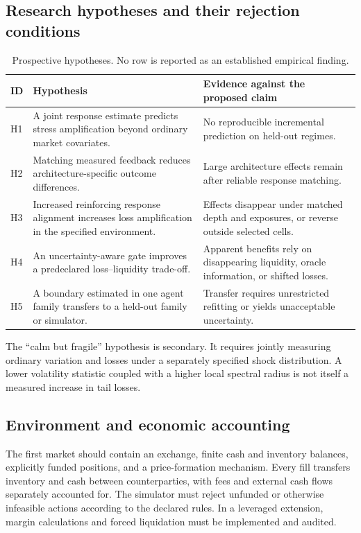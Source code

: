 \documentclass[11pt,a4paper]{article}
\theoremstyle{definition}
\theoremstyle{remark}
\begin{document}
\subsection{Research hypotheses and their rejection conditions}
\begin{table}[htbp]
\centering\small
\caption{Prospective hypotheses. No row is reported as an established empirical finding.}
\label{tab:hypotheses}
\begin{tabularx}{\textwidth}{p{}YY}
\toprule
ID & Hypothesis & Evidence against the proposed claim \\
\midrule
H1 & A joint response estimate predicts stress amplification beyond ordinary market covariates. & No reproducible incremental prediction on held-out regimes.\\
H2 & Matching measured feedback reduces architecture-specific outcome differences. & Large architecture effects remain after reliable response matching.\\
H3 & Increased reinforcing response alignment increases loss amplification in the specified environment. & Effects disappear under matched depth and exposures, or reverse outside selected cells.\\
H4 & An uncertainty-aware gate improves a predeclared loss--liquidity trade-off. & Apparent benefits rely on disappearing liquidity, oracle information, or shifted losses.\\
H5 & A boundary estimated in one agent family transfers to a held-out family or simulator. & Transfer requires unrestricted refitting or yields unacceptable uncertainty.\\
\bottomrule
\end{tabularx}
\end{table}
The ``calm but fragile'' hypothesis is secondary. It requires jointly measuring ordinary variation and losses under a separately specified shock distribution. A lower volatility statistic coupled with a higher local spectral radius is not itself a measured increase in tail losses.

\subsection{Environment and economic accounting}
The first market should contain an exchange, finite cash and inventory balances, explicitly funded positions, and a price-formation mechanism. Every fill transfers inventory and cash between counterparties, with fees and external cash flows separately accounted for. The simulator must reject unfunded or otherwise infeasible actions according to the declared rules. In a leveraged extension, margin calculations and forced liquidation must be implemented and audited.
\end{document}

